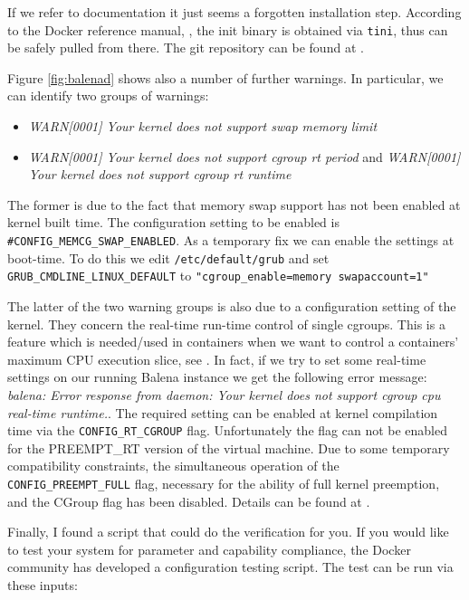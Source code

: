 \documentclass[]{scrartcl}
\begin{document}
If we refer to documentation it just seems a forgotten installation step.
According to the Docker reference manual, \cite{docker03}, the init binary is obtained via \texttt{tini}, thus can be safely pulled from there. The git repository can be found at \cite{tini01}.

Figure \ref{fig:balenad} shows also a number of further warnings. In particular, we can identify two groups of warnings:

\begin{itemize}
	\item \textit{WARN[0001] Your kernel does not support swap memory limit}

	\item \textit{WARN[0001] Your kernel does not support cgroup rt period} and \textit{WARN[0001] Your kernel does not support cgroup rt runtime} 
\end{itemize}

The former is due to the fact that memory swap support has not been enabled at kernel built time. 
The configuration setting to be enabled is \texttt{\#CONFIG\_MEMCG\_SWAP\_ENABLED}. As a temporary fix we can enable the settings at boot-time. 
To do this we edit \texttt{/etc/default/grub} and set 
\texttt{GRUB\_CMDLINE\_LINUX\_DEFAULT} to \texttt{"cgroup\_enable=memory swapaccount=1"}

The latter of the two warning groups is also due to a configuration setting of the kernel. They concern the real-time run-time control of single cgroups. This is a feature which is needed/used in containers when we want to control a containers' maximum CPU execution slice, see \cite{docker04}. 
In fact, if we try to set some real-time settings on our running Balena instance we get the following error message: \textit{balena: Error response from daemon: Your kernel does not support cgroup cpu real-time runtime.}.
The required setting can be enabled at kernel compilation time via the \texttt{CONFIG\_RT\_CGROUP} flag. 
%
Unfortunately the flag can not be enabled for the PREEMPT\_RT version of the virtual machine. Due to some temporary compatibility constraints, the simultaneous operation of the \texttt{CONFIG\_PREEMPT\_FULL} flag, necessary for the ability of full kernel preemption, and the CGroup flag has been disabled. Details can be found at \cite{lfnd01}.

Finally, I found a script that could do the verification for you. If you would like to test your system for parameter and capability compliance, the Docker community has developed a configuration testing script. The test can be run via these inputs:
\end{document}
